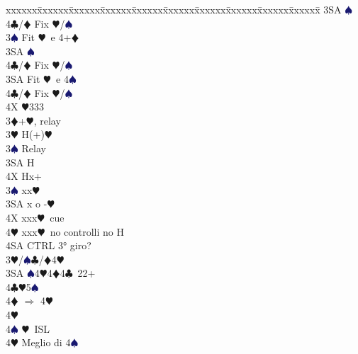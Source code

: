 \documentclass[a4paper,italian]{article}
\newcommand{\BC}{\textcolor{OliveGreen}{$\clubsuit$}}
\newcommand{\BD}{\textcolor{RedOrange}{$\vardiamondsuit$}}
\newcommand{\BH}{\textcolor{Red2}{$\varheartsuit${}}}
\newcommand{\BS}{\textcolor{MidnightBlue}{$\spadesuit${}}}
\newenvironment{bidtable}
{\begin{tabbing}

    xxxxxx\=xxxxxx\=xxxxxx\=xxxxxx\=xxxxxx\=xxxxxx\=xxxxxx\=xxxxxx\=xxxxxx\=xxxxxx\=\kill}
{\end{tabbing} }%
\begin{document}
\begin{multicols}{2}
\begin{bidtable}
                                            3SA \BS \+\\
                                            4\BC/\BD \> Fix \BH/\BS\-\-\\
                                            3\BS \> Fit \BH\ e 4+\BD \+\\
                                            3SA \BS \+\\
                                            4\BC/\BD \> Fix \BH/\BS\-\-\\
                                            3SA \> Fit \BH\ e 4\BS \+\\
                                            4\BC/\BD \> Fix \BH/\BS\-\-\\
                                            4X \BH 333\-\\
                                            3\BD {}+\BH , relay\+\\
                                            3\BH \> H(+)\BH \+\\
                                            3\BS \> Relay\+\\
                                            3SA \> H\\
                                            4X \> Hx+\-\-\\
                                            3\BS \> xx\BH \\
                                            3SA \> x o -\BH \\
                                            4X \> xxx\BH\ cue\\
                                            4\BH \> xxx\BH\ no controlli no H\+\\
                                            4SA \>CTRL 3° giro?\-\-\\
                                            3\BH/\BS {}\BC /\BD 4\BH \\
                                            3SA \BS 4\BH 4\BD 4\BC\ 22+\\
                                            4\BC {}\BH 5\BS \+\\
                                            4\BD \> $\Rightarrow$ 4\BH \+\\
                                            4\BH\+\\
                                            4\BS \> \BH\ ISL\-\-\\
                                            4\BH \> Meglio di 4\BS \\

\end{bidtable}
\end{multicols}
\end{document}
